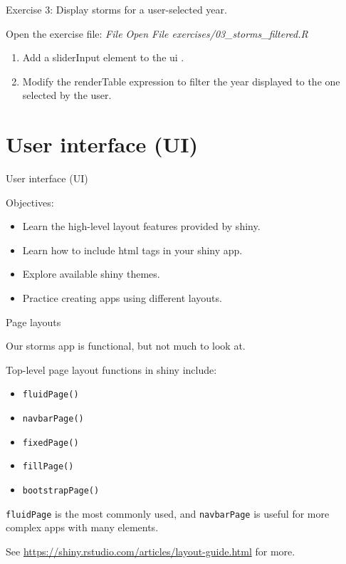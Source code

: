 \documentclass[
  12pt,
  ignorenonframetext,
]{beamer}
\providecommand{\tightlist}{%
  \setlength{\itemsep}{0pt}\setlength{\parskip}{0pt}}
\begin{document}
\begin{frame}{Exercise 3: Display storms for a user-selected year.}
\protect\hypertarget{exercise-3-display-storms-for-a-user-selected-year.}{}

Open the exercise file: \emph{File \rightarrow Open File
\rightarrow exercises/03\_storms\_filtered.R}

\begin{enumerate}
\item
  Add a sliderInput element to the ui .
\item
  Modify the renderTable expression to filter the year displayed to the
  one selected by the user.
\end{enumerate}

\end{frame}

\hypertarget{user-interface-ui}{%
\section{User interface (UI)}\label{user-interface-ui}}

\begin{frame}{User interface (UI)}

Objectives:

\begin{itemize}
\item
  Learn the high-level layout features provided by shiny.
\item
  Learn how to include html tags in your shiny app.
\item
  Explore available shiny themes.
\item
  Practice creating apps using different layouts.
\end{itemize}

\end{frame}

\begin{frame}[fragile]{Page layouts}
\protect\hypertarget{page-layouts}{}

Our storms app is functional, but not much to look at.

Top-level page layout functions in shiny include:

\begin{itemize}
\tightlist
\item
  \texttt{fluidPage()}
\item
  \texttt{navbarPage()}
\item
  \texttt{fixedPage()}
\item
  \texttt{fillPage()}
\item
  \texttt{bootstrapPage()}
\end{itemize}

\texttt{fluidPage} is the most commonly used, and \texttt{navbarPage} is
useful for more complex apps with many elements.

See \url{https://shiny.rstudio.com/articles/layout-guide.html} for more.

\end{frame}
\end{document}
